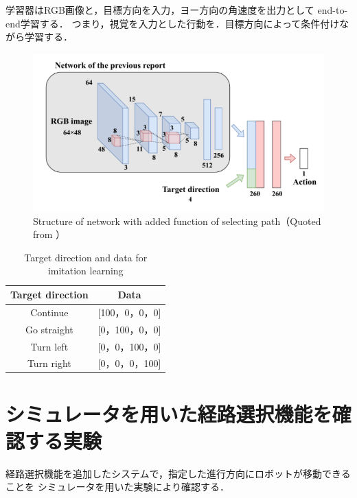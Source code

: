 学習器はRGB画像と，目標方向を入力，ヨー方向の角速度を出力として
end-to-end学習する．
つまり，視覚を入力とした行動を．目標方向によって条件付けながら学習する．
\begin{figure}[htbp]
    \centering
     \includegraphics[width=130mm]{images/pdf/haru_mech.pdf}
     \caption[Structure of network with added function of
     selecting path]{Structure of network with added function of
     selecting path（Quoted from \cite{haruyama2023}）}
     \label{fig:haru_mech_net}
\end{figure}

\begin{table}[htbp]
    \centering
    \caption{Target direction and data for imitation learning}\label{tab:target_old}
    \begin{tabular}{|c|c|}
    \hline
    Target direction & Data        \\
    \hline
    Continue   & {[}100，0，0，0{]} \\
    Go straight   & {[}0，100，0，0{]} \\
    Turn left   & {[}0，0，100，0{]} \\
    Turn right   & {[}0，0，0，100{]} \\
    \hline
    \end{tabular}
    \end{table}

\newpage
\section{シミュレータを用いた経路選択機能を確認する実験}
経路選択機能を追加したシステムで，指定した進行方向にロボットが移動できることを
シミュレータを用いた実験により確認する．

